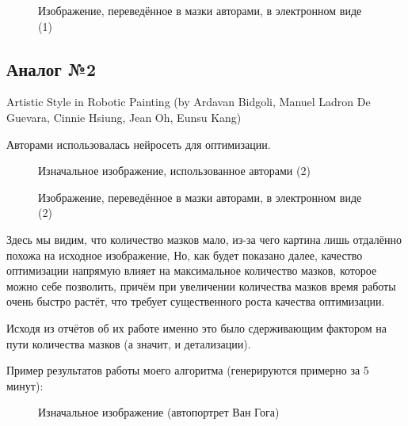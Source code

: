 \documentclass[11pt]{article}
\begin{document}
    \begin{figure}[h!]
        \centering
        \caption{Изображение, переведённое в мазки авторами, в электронном виде (1)}
        \label{fig:result_hod}
    \end{figure}

    \FloatBarrier

    \subsection{Аналог №2}\label{subsec:analog-2}
    Artistic Style in Robotic Painting (by Ardavan Bidgoli, Manuel Ladron De Guevara, Cinnie Hsiung, Jean Oh, Eunsu Kang)

    Авторами использовалась нейросеть для оптимизации.

    \begin{figure}[h!]
        \centering
        \caption{Изначальное изображение, использованное авторами (2)}
        \label{fig:initial_bidgoli}
    \end{figure}

    \begin{figure}[h!]
        \centering
        \caption{Изображение, переведённое в мазки авторами, в электронном виде (2)}
        \label{fig:result_bidgoli}
    \end{figure}

    \FloatBarrier


    Здесь мы видим, что количество мазков мало, из-за чего картина лишь отдалённо похожа на исходное изображение,
    Но, как будет показано далее, качество оптимизации напрямую влияет на максимальное количество мазков, которое можно себе позволить,
    причём при увеличении количества мазков время работы очень быстро растёт, что требует существенного роста качества оптимизации.

    Исходя из отчётов об их работе именно это было сдерживающим фактором на пути количества мазков (а значит, и детализации).

    Пример результатов работы моего алгоритма (генерируются примерно за 5 минут):

    \begin{figure}[h!]
        \centering
        \caption{Изначальное изображение (автопортрет Ван Гога)}
        \label{fig:van-gog-original}
    \end{figure}
    \FloatBarrier
\end{document}
